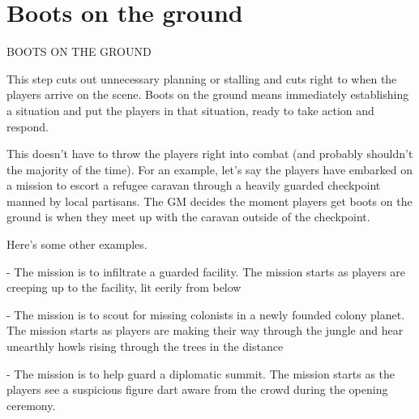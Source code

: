 \section{Boots on the ground}
                                  BOOTS ON THE GROUND


This step cuts out unnecessary planning or stalling and cuts right to when the players arrive on
the scene. Boots on the ground means immediately establishing a situation and put the players
in that situation, ready to take action and respond.


This doesn’t have to throw the players right into combat (and probably shouldn’t the majority of
the time). For an example, let’s say the players have embarked on a mission to escort a refugee
caravan through a heavily guarded checkpoint manned by local partisans. The GM decides the
moment players get boots on the ground is when they meet up with the caravan outside of the
checkpoint.


Here’s some other examples.

         	- The mission is to infiltrate a guarded facility. The mission starts as players are creeping
         up to the facility, lit eerily from below

         	- The mission is to scout for missing colonists in a newly founded colony planet. The
         mission starts as players are making their way through the jungle and hear unearthly
         howls rising through the trees in the distance

         	- The mission is to help guard a diplomatic summit. The mission starts as the players see
         a suspicious figure dart aware from the crowd during the opening ceremony.